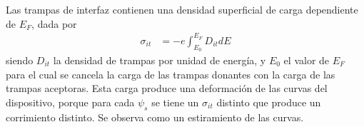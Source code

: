 Las trampas de interfaz contienen una densidad superficial de carga dependiente
de $E_F$, dada por
\begin{align*}
    \sigma_{it} &= -e\int_{E_0}^{E_F} D_{it}dE
\end{align*}
siendo $D_{it}$ la densidad de trampas por unidad de energía,
y $E_0$ el valor de $E_F$ para el cual se cancela la carga de las trampas
donantes con la carga de las trampas aceptoras.
Esta carga produce una deformación de las curvas del dispositivo,
porque para cada $\psi_s$ se tiene un $\sigma_{it}$ distinto que produce un
corrimiento distinto.
Se observa como un estiramiento de las curvas.
